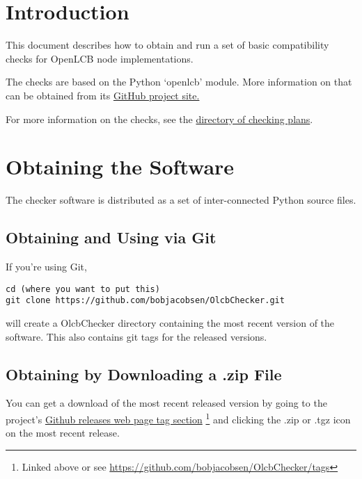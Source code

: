 



\maketitle
\thispagestyle{firststyle}

\section{Introduction}

This document describes how to obtain and run a set of basic compatibility checks for
OpenLCB node implementations.

The checks are based on the Python `openlcb' module.
More information on that can be obtained from its
\href{https://github.com/bobjacobsen/python-openlcb}{GitHub project site.}

For more information on the checks, see the
\href{https://github.com/bobjacobsen/OlcbChecker/tree/main/plans/}{directory of checking plans}.

\section{Obtaining the Software}

The checker software is distributed as a set of inter-connected Python source files.

\subsection{Obtaining and Using via Git}

If you're using Git,
\begin{verbatim}
cd (where you want to put this)
git clone https://github.com/bobjacobsen/OlcbChecker.git
\end{verbatim}
will create a OlcbChecker directory containing the most recent version of the software.
This also contains git tags for the released versions.

\subsection{Obtaining by Downloading a .zip File}

You can get a download of the most recent released version by going to the project's
\href{https://github.com/bobjacobsen/OlcbChecker/tags}{Github releases web page tag section}
\footnote{Linked above or see \href{https://github.com/bobjacobsen/OlcbChecker/tags}{https://github.com/bobjacobsen/OlcbChecker/tags}}
and clicking the .zip or .tgz icon on the most recent release.

